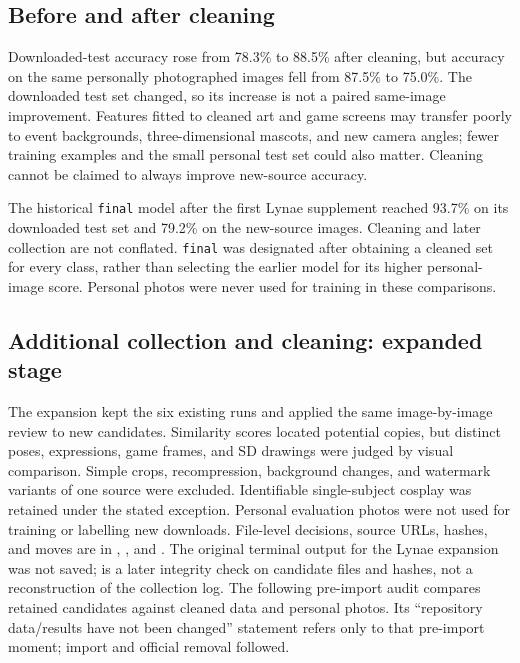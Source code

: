 \documentclass[11pt]{article}
\begin{document}
\par\noindent {}\par
\par\noindent {}\par
\par\noindent {}\par
\par\noindent {}\par
\subsection*{Before and after cleaning}
Downloaded-test accuracy rose from 78.3\% to 88.5\% after cleaning, but accuracy on the same personally photographed images fell from 87.5\% to 75.0\%. The downloaded test set changed, so its increase is not a paired same-image improvement. Features fitted to cleaned art and game screens may transfer poorly to event backgrounds, three-dimensional mascots, and new camera angles; fewer training examples and the small personal test set could also matter. Cleaning cannot be claimed to always improve new-source accuracy.

The historical \texttt{final} model after the first Lynae supplement reached 93.7\% on its downloaded test set and 79.2\% on the new-source images. Cleaning and later collection are not conflated. \texttt{final} was designated after obtaining a cleaned set for every class, rather than selecting the earlier model for its higher personal-image score. Personal photos were never used for training in these comparisons.

\subsection*{Additional collection and cleaning: expanded stage}
The expansion kept the six existing runs and applied the same image-by-image review to new candidates. Similarity scores located potential copies, but distinct poses, expressions, game frames, and SD drawings were judged by visual comparison. Simple crops, recompression, background changes, and watermark variants of one source were excluded. Identifiable single-subject cosplay was retained under the stated exception. Personal evaluation photos were not used for training or labelling new downloads. File-level decisions, source URLs, hashes, and moves are in , , and . The original terminal output for the Lynae expansion was not saved;  is a later integrity check on candidate files and hashes, not a reconstruction of the collection log. The following pre-import audit compares retained candidates against cleaned data and personal photos. Its ``repository data/results have not been changed'' statement refers only to that pre-import moment; import and official removal followed.
\end{document}
